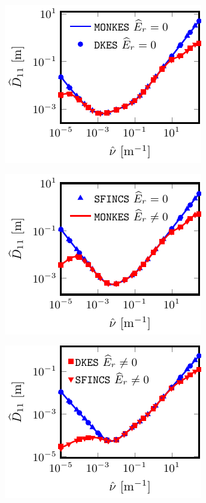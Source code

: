 \documentclass[10pt]{iopart}
\begin{document}
\begin{figure}[h]	
	\captionsetup[sub]{skip=-1.75pt, margin=95pt}
	\centering
	\begin{subfigure}[t]{0.32\textwidth}	
		\includegraphics{Benchmark-W7X-EIM-s0200-D11}
%		
		\caption{}
		\label{subfig:D11_Benchmark_W7X_EIM}
	\end{subfigure}
	\begin{subfigure}[t]{0.32\textwidth}	
		\includegraphics{Benchmark-W7X-KJM-s0204-D11}	
%		
		\caption{}
		\label{subfig:D11_Benchmark_W7X_KJM}
	\end{subfigure}
	\begin{subfigure}[t]{0.32\textwidth}	
		\includegraphics{Benchmark-CIEMAT-QI-s0250-D11}

\end{subfigure}
\end{figure}
\end{document}
